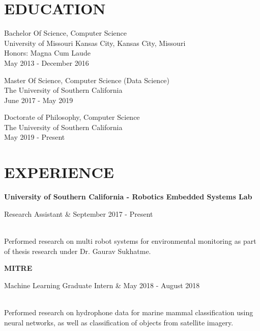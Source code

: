 \documentclass[margin,10pt]{res} %
\begin{document}

\address{ 1026 W 22nd St. \\ Los Angeles, California 90007  \\
(913) 908-6148 \\ cdennist@usc.edu}

\begin{resume}
\section{EDUCATION}      
Bachelor Of Science, Computer Science  \\
               University of Missouri Kansas City, Kansas City, Missouri \\
               Honors: Magna Cum Laude\\
               May 2013 - December 2016

Master Of Science, Computer Science (Data Science) \\
   The University of Southern California \\
   June 2017 - May 2019
    
Doctorate of Philosophy, Computer Science \\
   The University of Southern California \\
   May 2019 - Present
\section{EXPERIENCE}
	      {\bf University of Southern California - Robotics Embedded Systems Lab} \\
           \begin{ncolumn}{2}
           Research Assistant & September 2017 - Present
           \end{ncolumn} \\           
           Performed research on multi robot systems for environmental monitoring as part of thesis research under Dr. Gaurav Sukhatme.
       
       
        {\bf MITRE} \\
           \begin{ncolumn}{2}
           Machine Learning Graduate Intern & May 2018 - August 2018
           \end{ncolumn} \\
           Performed research on hydrophone data for marine mammal classification using neural networks, as well as classification of objects from satellite imagery.   
           

\end{resume}
\end{document}
